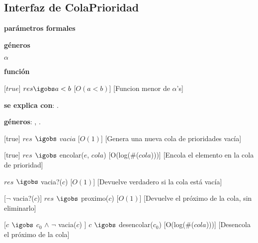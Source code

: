 \begin{Interfaz}
\subsection{Interfaz de ColaPrioridad}

  \textbf{par\'ametros formales}\parindent\\
  \parbox{1.7cm}{\textbf{g\'eneros}} $\alpha$\\
  \parbox[t]{1.7cm}{\textbf{funci\'on}}\parbox[t]{\textwidth-2\parindent-1.7cm}{%
    [$true$]
    {$res \igobs a < b$}
    [$O(a < b)$]
    [Funcion menor de $\alpha$'s]
  }

\textbf{se explica con}: .

\textbf{g\'eneros}: , .



%
[true]   %
{$res$ $\igobs$ $vacia$} %
[$O(1)$]   %
[Genera una nueva cola de prioridades vac\'ia]  %

%
[true]   %
{$res$ $\igobs$ encolar($e$, $cola$)} %
[O(log($\#$($cola$)))]   %
[Encola el elemento en la cola de prioridad]  %

{$res$ $\igobs$ vacia?($c$)}
[$O(1)$]
[Devuelve verdadero si la cola est\'a vac\'ia]

[$\neg$ vacia?($c$)]  
{$res$ $\igobs$ proximo($c$)}  %
[$O(1)$]
[Devuelve el pr\'oximo de la cola, sin eliminarlo]

[$c$ $\igobs$ $c_0$ $\land$ $\neg$ vacia($c$) ]  
{$c$ $\igobs$ desencolar($c_0$)} 
[O(log($\#$($cola$)))]   %
[Desencola el pr\'oximo de la cola]


$ $\newline
$ $\newline




\begin{tad}{}



\end{tad}

\end{Interfaz}